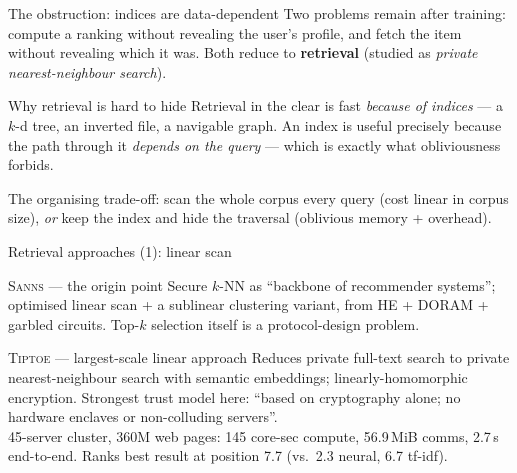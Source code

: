 \documentclass[10pt,aspectratio=169]{beamer}
\newcommand{\sys}[1]{\textsc{#1}\xspace}
\begin{document}
\begin{frame}{The obstruction: indices are data-dependent}
  Two problems remain after training: \alert{compute a ranking} without revealing the
  user's profile, and \alert{fetch the item} without revealing which it was.
  Both reduce to \textbf{retrieval} (studied as \emph{private nearest-neighbour search}).
 
  \begin{block}{Why retrieval is hard to hide}
    Retrieval in the clear is fast \emph{because of indices} --- a $k$-d tree, an
    inverted file, a navigable graph. An index is useful precisely because the path
    through it \emph{depends on the query} --- which is exactly what obliviousness forbids.
  \end{block}
 
  \begin{center}\small
  \alert{The organising trade-off:} scan the whole corpus every query (cost linear in
  corpus size), \emph{or} keep the index and hide the traversal (oblivious memory + overhead).
  \end{center}
\end{frame}
 
\begin{frame}{Retrieval approaches (1): linear scan}
  \begin{block}{\sys{Sanns} --- the origin point}
    \footnotesize Secure $k$-NN as ``backbone of recommender systems''; optimised linear
    scan + a sublinear clustering variant, from HE + DORAM + garbled circuits.
    Top-$k$ selection itself is a protocol-design problem.
  \end{block}
 
  \begin{block}{\sys{Tiptoe} --- largest-scale linear approach}
    \footnotesize
    Reduces private full-text search to private nearest-neighbour search with
    semantic embeddings; linearly-homomorphic encryption. \alert{Strongest trust model here}:
    ``based on cryptography alone; no hardware enclaves or non-colluding servers''.
    \\[0.2em]
    45-server cluster, 360M web pages: 145 core-sec compute, 56.9\,MiB comms,
    2.7\,s end-to-end. Ranks best result at position 7.7 (vs.\ 2.3 neural, 6.7 tf-idf).
  \end{block}
\end{frame}
 
\end{document}
